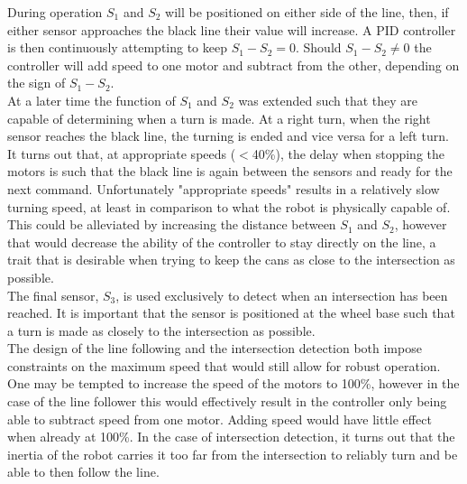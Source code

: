During operation $S_1$ and $S_2$ will be positioned on either side of the line, then, if either sensor approaches the black line their value will increase.
A PID controller is then continuously attempting to keep $S_1-S_2=0$.
Should $S_1-S_2 \neq 0$ the controller will add speed to one motor and subtract from the other, depending on the sign of $S_1-S_2$. \\

At a later time the function of $S_1$ and $S_2$ was extended such that they are capable of determining when a turn is made.
At a right turn, when the right sensor reaches the black line, the turning is ended and vice versa for a left turn.
It turns out that, at appropriate speeds ($<$40\%), the delay when stopping the motors is such that the black line is again between the sensors and ready for the next command.
Unfortunately "appropriate speeds" results in a relatively slow turning speed, at least in comparison to what the robot is physically capable of.
This could be alleviated by increasing the distance between $S_1$ and $S_2$, however that would decrease the ability of the controller to stay directly on the line, a trait that is desirable when trying to keep the cans as close to the intersection as possible.\\

The final sensor, $S_3$, is used exclusively to detect when an intersection has been reached.
It is important that the sensor is positioned at the wheel base such that a turn is made as closely to the intersection as possible.\\

The design of the line following and the intersection detection both impose constraints on the maximum speed that would still allow for robust operation.
One may be tempted to increase the speed of the motors to 100\%, however in the case of the line follower this would effectively result in the controller only being able to subtract speed from one motor. 
Adding speed would have little effect when already at 100\%.
In the case of intersection detection, it turns out that the inertia of the robot carries it too far from the intersection to reliably turn and be able to then follow the line.

